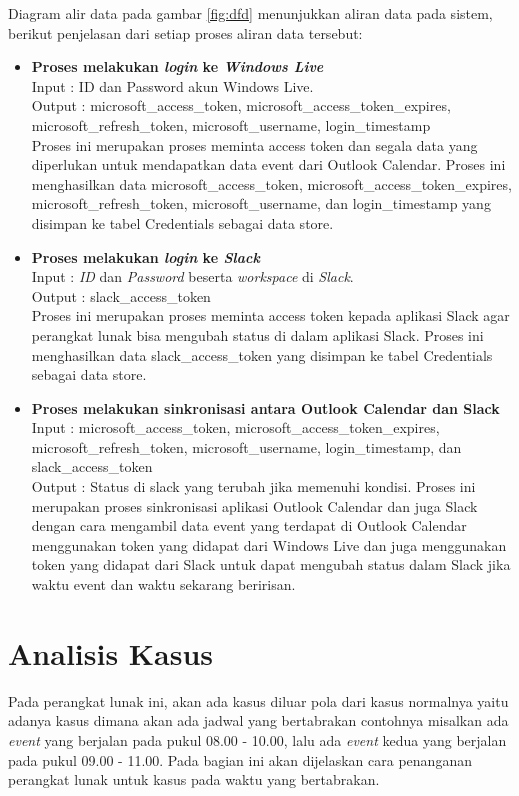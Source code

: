 Diagram alir data pada gambar \ref{fig:dfd} menunjukkan aliran data pada sistem, berikut penjelasan dari setiap proses aliran data tersebut:
\begin{itemize}
    \item \textbf{Proses melakukan \textit{login} ke \textit{Windows Live}}\\
    Input : ID dan Password akun Windows Live.\\
    Output : microsoft\_access\_token, microsoft\_access\_token\_expires, microsoft\_refresh\_token, microsoft\_username, login\_timestamp\\
    Proses ini merupakan proses meminta access token dan segala data yang diperlukan untuk mendapatkan data event dari Outlook Calendar. Proses ini menghasilkan data microsoft\_access\_token, microsoft\_access\_token\_expires, microsoft\_refresh\_token, microsoft\_username, dan login\_timestamp yang disimpan ke tabel Credentials sebagai data store. 
    \item \textbf{Proses melakukan \textit{login} ke \textit{Slack}}\\
    Input : \textit{ID} dan \textit{Password} beserta \textit{workspace} di \textit{Slack}.\\
    Output : slack\_access\_token\\
    Proses ini merupakan proses meminta access token kepada aplikasi Slack agar perangkat lunak bisa mengubah status di dalam aplikasi Slack. Proses ini menghasilkan data slack\_access\_token yang disimpan ke tabel Credentials sebagai data store. 
    \item \textbf{Proses melakukan sinkronisasi antara Outlook Calendar dan Slack}\\
    Input : microsoft\_access\_token, microsoft\_access\_token\_expires, microsoft\_refresh\_token, microsoft\_username, login\_timestamp, dan slack\_access\_token\\
    Output : Status di slack yang terubah jika memenuhi kondisi. 
    Proses ini merupakan proses sinkronisasi aplikasi Outlook Calendar dan juga Slack dengan cara mengambil data event yang terdapat di Outlook Calendar menggunakan token yang didapat dari Windows Live dan juga menggunakan token yang didapat dari Slack untuk dapat mengubah status dalam Slack jika waktu event dan waktu sekarang beririsan. 
\end{itemize}

\section{Analisis Kasus}
Pada perangkat lunak ini, akan ada kasus diluar pola dari kasus normalnya yaitu adanya kasus dimana akan ada jadwal yang bertabrakan contohnya misalkan ada \textit{event} yang berjalan pada pukul 08.00 - 10.00, lalu ada \textit{event} kedua yang berjalan pada pukul 09.00 - 11.00. Pada bagian ini akan dijelaskan cara penanganan perangkat lunak untuk kasus pada waktu yang bertabrakan. 

